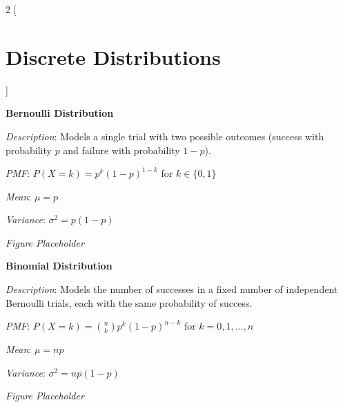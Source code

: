 \documentclass{article}
\begin{document}
  
\begin{multicols}{2}
[
\section*{Discrete Distributions}
]

\begin{mdframed}
\textbf{Bernoulli Distribution}

\textit{Description}: Models a single trial with two possible outcomes (success with probability $p$ and failure with probability $1-p$).

\textit{PMF}: $P(X=k) = p^k(1-p)^{1-k}$ for $k \in \{0,1\}$

\textit{Mean}: $\mu = p$

\textit{Variance}: $\sigma^2 = p(1-p)$

\textit{Figure Placeholder}

\end{mdframed}

\begin{mdframed}
\textbf{Binomial Distribution}

\textit{Description}: Models the number of successes in a fixed number of independent Bernoulli trials, each with the same probability of success.

\textit{PMF}: $P(X=k) = \binom{n}{k}p^k(1-p)^{n-k}$ for $k = 0, 1, ..., n$

\textit{Mean}: $\mu = np$

\textit{Variance}: $\sigma^2 = np(1-p)$

\textit{Figure Placeholder}

\end{mdframed}

\end{multicols}
\end{document}
